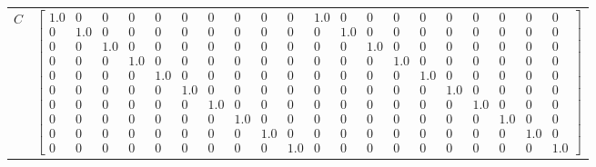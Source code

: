\begin{tabular}{cl}
   $C$    & $\left[\begin{array}{cccccccccccccccccccc}1.0 & 0 & 0 & 0 & 0 & 0 & 0 & 0 & 0 & 0 & 1.0 & 0 & 0 & 0 & 0 & 0 & 0 & 0 & 0 & 0\\0 & 1.0 & 0 & 0 & 0 & 0 & 0 & 0 & 0 & 0 & 0 & 1.0 & 0 & 0 & 0 & 0 & 0 & 0 & 0 & 0\\0 & 0 & 1.0 & 0 & 0 & 0 & 0 & 0 & 0 & 0 & 0 & 0 & 1.0 & 0 & 0 & 0 & 0 & 0 & 0 & 0\\0 & 0 & 0 & 1.0 & 0 & 0 & 0 & 0 & 0 & 0 & 0 & 0 & 0 & 1.0 & 0 & 0 & 0 & 0 & 0 & 0\\0 & 0 & 0 & 0 & 1.0 & 0 & 0 & 0 & 0 & 0 & 0 & 0 & 0 & 0 & 1.0 & 0 & 0 & 0 & 0 & 0\\0 & 0 & 0 & 0 & 0 & 1.0 & 0 & 0 & 0 & 0 & 0 & 0 & 0 & 0 & 0 & 1.0 & 0 & 0 & 0 & 0\\0 & 0 & 0 & 0 & 0 & 0 & 1.0 & 0 & 0 & 0 & 0 & 0 & 0 & 0 & 0 & 0 & 1.0 & 0 & 0 & 0\\0 & 0 & 0 & 0 & 0 & 0 & 0 & 1.0 & 0 & 0 & 0 & 0 & 0 & 0 & 0 & 0 & 0 & 1.0 & 0 & 0\\0 & 0 & 0 & 0 & 0 & 0 & 0 & 0 & 1.0 & 0 & 0 & 0 & 0 & 0 & 0 & 0 & 0 & 0 & 1.0 & 0\\0 & 0 & 0 & 0 & 0 & 0 & 0 & 0 & 0 & 1.0 & 0 & 0 & 0 & 0 & 0 & 0 & 0 & 0 & 0 & 1.0\end{array}\right]$                                                                                                                                                                                                                                                                                                                                                                                                                                                                                                                                                                                                                                                                                                                                                                                                                                                                                                                       \\

\end{tabular}
